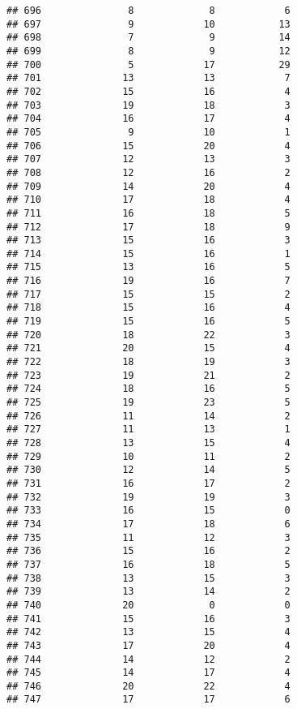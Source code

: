 \documentclass[
]{article}
\begin{document}
\begin{verbatim}
## 696               8             8            6
## 697               9            10           13
## 698               7             9           14
## 699               8             9           12
## 700               5            17           29
## 701              13            13            7
## 702              15            16            4
## 703              19            18            3
## 704              16            17            4
## 705               9            10            1
## 706              15            20            4
## 707              12            13            3
## 708              12            16            2
## 709              14            20            4
## 710              17            18            4
## 711              16            18            5
## 712              17            18            9
## 713              15            16            3
## 714              15            16            1
## 715              13            16            5
## 716              19            16            7
## 717              15            15            2
## 718              15            16            4
## 719              15            16            5
## 720              18            22            3
## 721              20            15            4
## 722              18            19            3
## 723              19            21            2
## 724              18            16            5
## 725              19            23            5
## 726              11            14            2
## 727              11            13            1
## 728              13            15            4
## 729              10            11            2
## 730              12            14            5
## 731              16            17            2
## 732              19            19            3
## 733              16            15            0
## 734              17            18            6
## 735              11            12            3
## 736              15            16            2
## 737              16            18            5
## 738              13            15            3
## 739              13            14            2
## 740              20             0            0
## 741              15            16            3
## 742              13            15            4
## 743              17            20            4
## 744              14            12            2
## 745              14            17            4
## 746              20            22            4
## 747              17            17            6

\end{verbatim}
\end{document}
